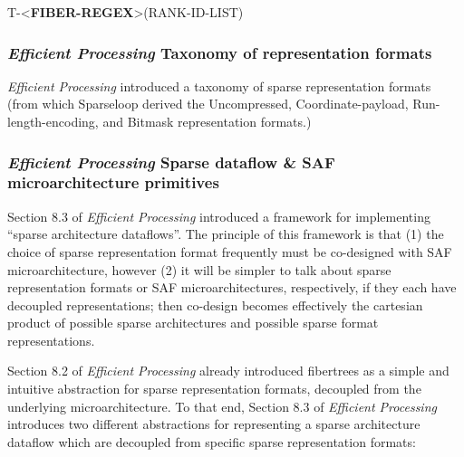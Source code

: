 T-<\textbf{FIBER-REGEX}>(RANK-ID-LIST)

\subsubsection{\textit{Efficient Processing} Taxonomy of representation formats}

\textit{Efficient Processing} introduced a taxonomy of sparse representation formats (from which Sparseloop\cite{sparseloop}
derived the Uncompressed, Coordinate-payload, Run-length-encoding, and Bitmask representation formats.) 

\subsubsection{\textit{Efficient Processing} Sparse dataflow \& SAF microarchitecture primitives}

Section 8.3 of \textit{Efficient Processing} introduced a framework for implementing ``sparse architecture dataflows''. The principle of this framework is that (1) the choice of sparse representation format frequently must be co-designed with SAF microarchitecture, however (2) it will be simpler to talk about sparse representation formats or SAF microarchitectures, respectively, if they each have decoupled representations; then co-design becomes effectively the cartesian product of possible sparse architectures and possible sparse format representations. 

Section 8.2 of \textit{Efficient Processing} already introduced fibertrees as a simple and intuitive abstraction for sparse representation formats, decoupled from the underlying microarchitecture. To that end, Section 8.3 of \textit{Efficient Processing} introduces two different abstractions for representing a sparse architecture dataflow which are decoupled from specific sparse representation formats:

